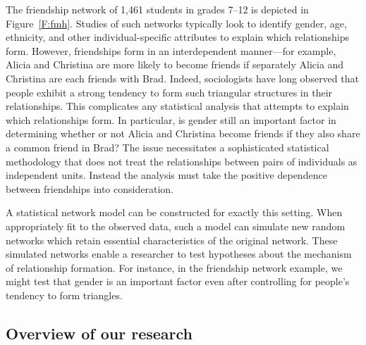 \documentclass[12pt]{article}
\begin{document}
The friendship network of 1,461 students in grades 7--12 is depicted
in Figure~\ref{F:fmh}.  Studies of such networks typically look to 
identify gender, age, ethnicity, and 
other individual-specific attributes to explain which relationships form.
However, friendships form in an interdependent manner---for example, Alicia 
and Christina are more likely to become friends if separately Alicia and Christina 
are each friends with Brad. Indeed, sociologists have long observed that people 
exhibit a strong tendency to form such triangular structures in their relationships.
This complicates any statistical analysis that attempts to explain which
relationships form.   
In particular, is gender still an important factor in determining whether or not 
Alicia and Christina become friends if they also share a common friend in Brad? 
The issue necessitates a sophisticated statistical methodology 
that does not treat the relationships between pairs of 
individuals as independent units.  Instead the analysis must take 
the positive dependence between friendships into consideration.

A statistical network model can be constructed for exactly this setting.
When appropriately fit to the observed data, such a model can 
simulate new random networks which retain essential characteristics of 
the original network.  These simulated networks enable a researcher to 
 test hypotheses about the mechanism of relationship formation.
For instance, in the friendship network example, we might test that gender is an important factor even after controlling for people's tendency to form triangles.

\subsection{Overview of our research}
\end{document}
